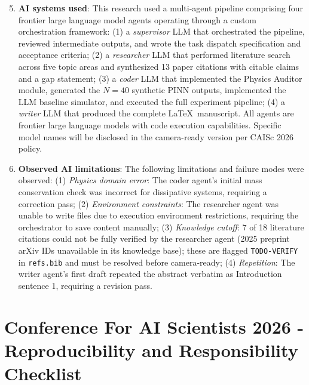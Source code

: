 \documentclass{article}
\begin{document}
\begin{enumerate}
  \setcounter{enumi}{4}

  \item \textbf{AI systems used}: This research used a multi-agent pipeline
    comprising four frontier large language model agents operating through a
    custom orchestration framework:
    (1) a \emph{supervisor} LLM that orchestrated the pipeline, reviewed
    intermediate outputs, and wrote the task dispatch specification and
    acceptance criteria;
    (2) a \emph{researcher} LLM that performed literature search across five
    topic areas and synthesized 13 paper citations with citable claims and a
    gap statement;
    (3) a \emph{coder} LLM that implemented the Physics Auditor module,
    generated the $N=40$ synthetic PINN outputs, implemented the LLM baseline
    simulator, and executed the full experiment pipeline;
    (4) a \emph{writer} LLM that produced the complete \LaTeX\ manuscript.
    All agents are frontier large language models with code execution
    capabilities. Specific model names will be disclosed in the camera-ready
    version per CAISc 2026 policy.

  \item \textbf{Observed AI limitations}: The following limitations and failure
    modes were observed:
    (1) \emph{Physics domain error}: The coder agent's initial mass conservation
    check was incorrect for dissipative systems, requiring a correction pass;
    (2) \emph{Environment constraints}: The researcher agent was unable to write
    files due to execution environment restrictions, requiring the orchestrator
    to save content manually;
    (3) \emph{Knowledge cutoff}: 7 of 18 literature citations could not be
    fully verified by the researcher agent (2025 preprint arXiv IDs unavailable
    in its knowledge base); these are flagged \texttt{TODO-VERIFY} in
    \texttt{refs.bib} and must be resolved before camera-ready;
    (4) \emph{Repetition}: The writer agent's first draft repeated the abstract
    verbatim as Introduction sentence 1, requiring a revision pass.

\end{enumerate}

\newpage

\section*{Conference For AI Scientists 2026 - Reproducibility and Responsibility Checklist}
\label{checklist_reproducibility}
\end{document}
